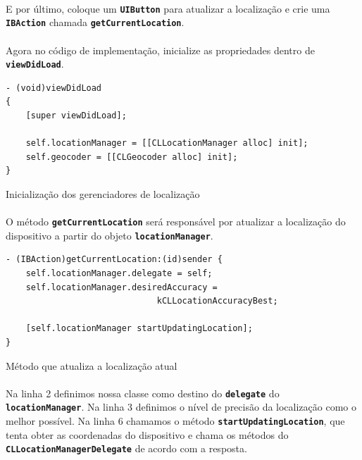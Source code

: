 \documentclass[a4paper,12pt,brazil,doubleside]{book}
\begin{document}
\begin{singlespace}
\paragraph{}E por último, coloque um \texttt{\textbf{UIButton}} para atualizar a localização e crie uma \texttt{\textbf{IBAction}} chamada \texttt{\textbf{getCurrentLocation}}.
\paragraph{}Agora no código de implementação, inicialize as propriedades dentro de \texttt{\textbf{viewDidLoad}}.

\begin{listing}[H]
\begin{verbatim}
- (void)viewDidLoad
{
    [super viewDidLoad];
    
    self.locationManager = [[CLLocationManager alloc] init];
    self.geocoder = [[CLGeocoder alloc] init];
}
\end{verbatim}
\caption{Inicialização dos gerenciadores de localização}
\end{listing}

\paragraph{}O método \texttt{\textbf{getCurrentLocation}} será responsável por atualizar a localização do dispositivo a partir do objeto \texttt{\textbf{locationManager}}.

\begin{listing}[H]
\begin{verbatim}
- (IBAction)getCurrentLocation:(id)sender {
    self.locationManager.delegate = self;
    self.locationManager.desiredAccuracy =
                              kCLLocationAccuracyBest;
    
    [self.locationManager startUpdatingLocation];
}
\end{verbatim}
\caption{Método que atualiza a localização atual}
\end{listing}

\paragraph{}Na linha 2 definimos nossa classe como destino do \texttt{\textbf{delegate}} do \texttt{\textbf{locationManager}}. Na linha 3 definimos o nível de precisão da localização como o melhor possível. Na linha 6 chamamos o método \texttt{\textbf{startUpdatingLocation}}, que tenta obter as coordenadas do dispositivo e chama os métodos do \texttt{\textbf{CLLocationManagerDelegate}} de acordo com a resposta.

\end{singlespace}
\end{document}

